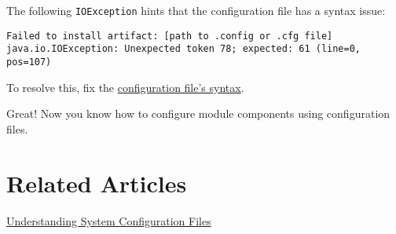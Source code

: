 The following \texttt{IOException} hints that the configuration file has
a syntax issue:

\begin{verbatim}
Failed to install artifact: [path to .config or .cfg file]
java.io.IOException: Unexpected token 78; expected: 61 (line=0, pos=107)
\end{verbatim}

To resolve this, fix the
\hyperref[configuration-file-formats]{configuration file's syntax}.

Great! Now you know how to configure module components using
configuration files.

\section{Related Articles}\label{related-articles}

\href{/docs/7-1/user/-/knowledge_base/u/understanding-system-configuration-files}{Understanding
System Configuration Files}
